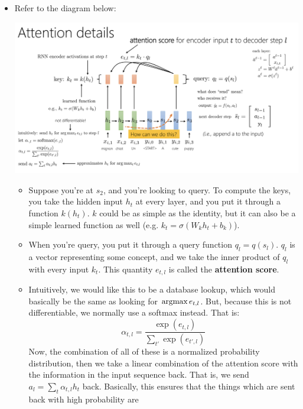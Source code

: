 \begin{itemize}
	\item Refer to the diagram below:
		\begin{center}
			\includegraphics[scale=0.5]{images/lec11-4.png}
		\end{center}
		\begin{itemize}
			\item Suppose you're at \( s_2 \), and you're looking to query.
				To compute the keys, you take the hidden input \( h_t \) at 
				every layer, and you put it through a function \( k(h_t) \). \( k \) 
				could be as simple as the identity, but it can also be a simple 
				learned function as well (e.g. \( k_t = \sigma(W_k h_t + b_k) \)). 
			\item When you're query, you put it through a query function \( q_{l} =
				q(s_l) \). \( q_l \) is a vector representing some concept, and
				we take the inner product of \( q_l \) with every input \( k_t \).
				This quantity \( e_{t, l} \) is called the \textbf{attention score}.  
			\item Intuitively, we would like this to be a database lookup, which
				would basically be the same as looking for \( \operatorname*{argmax} e_{t, l} \).
				But, because this is not differentiable, we normally use a softmax
				instead.  That is:
				\[
					\alpha_{t, l} = \frac{\exp(e_{t, l})}{\sum_{t'} \exp(e_{t', l})}
				\]
				Now, the combination of all of these is a normalized probability
				distribution, then we take a linear combination of the attention
				score with the information in the input sequence back. That is, we
				send \( a_l = \sum_t \alpha_{t, l} h_t \) back. Basically, this
				ensures that the things which are sent back with high probability are

\end{itemize}
\end{itemize}

